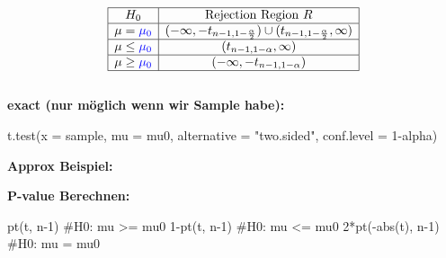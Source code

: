 \[
\begin{array}{|c|c|}
\hline
H_0 & \text{Rejection Region } R \\ \hline
\mu = \textcolor{blue}{\mu_0} & (-\infty, -t_{n-1, 1-\frac{\alpha}{2}}) \cup (t_{n-1, 1-\frac{\alpha}{2}}, \infty) \\ \hline
\mu \leq \textcolor{blue}{\mu_0} & (t_{n-1, 1-\alpha}, \infty) \\ \hline
\mu \geq \textcolor{blue}{\mu_0} & (-\infty, -t_{n-1, 1-\alpha}) \\ \hline
\end{array}
\]
\centering{}\\
\textbf{exact \textcolor{red}{\warning}(nur möglich wenn wir Sample habe)\textcolor{red}{\warning}:}
\begin{rcode}{1}
t.test(x = sample, mu = mu0, alternative = "two.sided", conf.level = 1-alpha)
\end{rcode}
\large{\textbf{Approx Beispiel:}}
\textbf{P-value Berechnen:}
\begin{rcode}{1}
pt(t, n-1) #H0: mu >= mu0
1-pt(t, n-1) #H0: mu <= mu0
2*pt(-abs(t), n-1) #H0: mu = mu0
\end{rcode}

\columnbreak